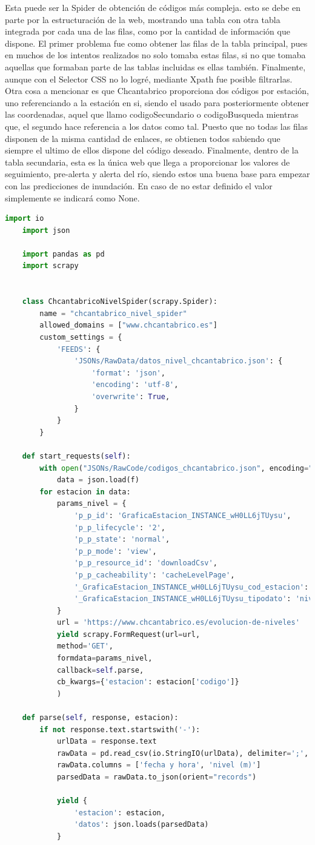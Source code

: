 Esta puede ser la Spider de obtención de códigos más compleja. esto se debe en parte por la estructuración de la web, mostrando una tabla con otra tabla integrada por cada una de las filas, como por la cantidad de información que dispone.\newline
El primer problema fue como obtener las filas de la tabla principal, pues en muchos de los intentos realizados no solo tomaba estas filas, si no que tomaba aquellas que formaban parte de las tablas incluidas es ellas también. Finalmente, aunque con el Selector CSS no lo logré, mediante Xpath fue posible filtrarlas.\newline
Otra cosa a mencionar es que Chcantabrico proporciona dos códigos por estación, uno referenciando a la estación en si, siendo el usado para posteriormente obtener las coordenadas, aquel que llamo codigoSecundario o codigoBusqueda mientras que, el segundo hace referencia a los datos como tal. Puesto que no todas las filas disponen de la misma cantidad de enlaces, se obtienen todos sabiendo que siempre el ultimo de ellos dispone del código deseado.\newline
Finalmente, dentro de la tabla secundaria, esta es la única web que llega a proporcionar los valores de seguimiento, pre-alerta y alerta del río, siendo estos una buena base para empezar con las predicciones de inundación. En caso de no estar definido el valor simplemente se indicará como None.

\begin{lstlisting}[language=Python, caption={Nivel Spider}]
	import io
	import json
	
	import pandas as pd
	import scrapy
	
	
	class ChcantabricoNivelSpider(scrapy.Spider):
		name = "chcantabrico_nivel_spider"
		allowed_domains = ["www.chcantabrico.es"]
		custom_settings = {
			'FEEDS': {
				'JSONs/RawData/datos_nivel_chcantabrico.json': {
					'format': 'json',
					'encoding': 'utf-8',
					'overwrite': True,
				}
			}
		}
	
	def start_requests(self):
		with open("JSONs/RawCode/codigos_chcantabrico.json", encoding="utf-8") as f:
			data = json.load(f)
		for estacion in data:
			params_nivel = {
				'p_p_id': 'GraficaEstacion_INSTANCE_wH0LL6jTUysu',
				'p_p_lifecycle': '2',
				'p_p_state': 'normal',
				'p_p_mode': 'view',
				'p_p_resource_id': 'downloadCsv',
				'p_p_cacheability': 'cacheLevelPage',
				'_GraficaEstacion_INSTANCE_wH0LL6jTUysu_cod_estacion': f'{estacion["codigo"]}',
				'_GraficaEstacion_INSTANCE_wH0LL6jTUysu_tipodato': 'nivel',
			}
			url = 'https://www.chcantabrico.es/evolucion-de-niveles'
			yield scrapy.FormRequest(url=url,
			method='GET',
			formdata=params_nivel,
			callback=self.parse,
			cb_kwargs={'estacion': estacion['codigo']}
			)
	
	def parse(self, response, estacion):
		if not response.text.startswith('-'):
			urlData = response.text
			rawData = pd.read_csv(io.StringIO(urlData), delimiter=';', encoding='utf-8', header=1)
			rawData.columns = ['fecha y hora', 'nivel (m)']
			parsedData = rawData.to_json(orient="records")
			
			yield {
				'estacion': estacion,
				'datos': json.loads(parsedData)
			}
\end{lstlisting}

